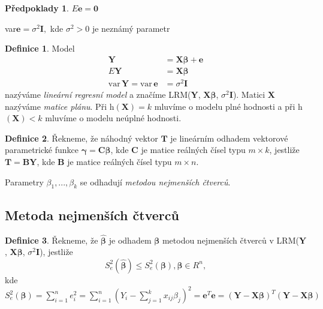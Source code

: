 \documentclass[a4]{report}
\theoremstyle{definition}
\newtheorem{definition}{Definice}[section]
\newtheorem{predpoklady}{Předpoklady}[section]
\begin{document}
{\begin{predpoklady}
\itemize
    \item $E\mathbf{e}=\mathbf{0}$
    \item var$\mathbf{e}=\sigma^2 \mathbf{I},$ kde $\sigma^2 > 0$ je neznámý parametr 
\end{predpoklady}

\begin{definition}
Model 
\begin{align*}
\mathbf{Y} &= \mathbf{X} \pmb{\beta} + \mathbf{e} \\
E \mathbf{Y} &= \mathbf{X} \pmb{\beta} \\
\mathrm{var} \, \mathbf{Y} = \mathrm{var} \, \mathbf{e} &= \sigma^{2} \mathbf{I} 
\end{align*}
nazýváme \textit{lineární regresní model} a značíme LRM($\mathbf{Y}$, $\mathbf{X} \pmb{\beta}$, $\sigma^2 \mathbf{I}$). Matici $\mathbf{X}$ nazýváme \textit{matice plánu}. Při h$(\mathbf{X})=k$ mluvíme o modelu plné hodnosti a při h$(\mathbf{X})<k$ mluvíme o modelu neúplné hodnosti.
\end{definition}

\begin{definition}
Řekneme, že náhodný vektor $\mathbf{T}$ je lineárním odhadem vektorové parametrické funkce $\pmb{\gamma} = \mathbf{C} \pmb{\beta}$, kde $\mathbf{C}$ je matice reálných čísel typu $m \times k$, jestliže $\mathbf{T} = \mathbf{BY}$, kde $\mathbf{B}$ je matice reálných čísel typu $m \times n$.
\end{definition}

Parametry $\beta_1, ..., \beta_k$ se odhadují \textit{metodou nejmenších čtverců}.

\subsection{Metoda nejmenších čtverců} 
\begin{definition}
Řekneme, že $\pmb{\hat{\beta}}$ je odhadem $\pmb{\beta}$ metodou nejmenších čtverců v LRM($\mathbf{Y}$, $\mathbf{X} \pmb{\beta}$, $\sigma^2 \mathbf{I}$), jestliže 
$$ S_{e}^{2} \left( \pmb{\hat{\beta}} \right) \leq S_{e}^{2} \left( \pmb{\beta} \right), \pmb{\beta} \in R ^ n ,$$ kde $ S_{e}^{2} \left( \pmb{\beta} \right) = \sum^{n}_{i=1} e_{i}^{2} = \sum^{n}_{i=1} \left( Y_i - \sum^{k}_{j=1} x_{ij} \beta_j \right) ^2 = \mathbf{e}^T \mathbf{e} = \left( \mathbf{Y} - \mathbf{X} \pmb{\beta} \right) ^T \left( \mathbf{Y} - \mathbf{X} \pmb{\beta} \right) $ 
\end{definition}

}
\end{document}
